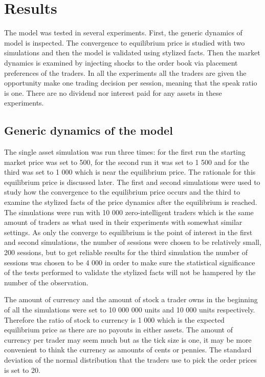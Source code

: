 
\section{Results}

The model was tested in several experiments. First, the generic dynamics of 
model is inspected. The convergence to equilibrium price is studied with two
simulations and then the model is validated using stylized facts. Then the
market dynamics is examined by injecting shocks to the order book via placement 
preferences of the traders. In all the experiments all the traders are given the 
opportunity make one trading decision per session, meaning that the speak ratio 
is one. There are no dividend nor interest paid for any assets in these experiments.

\subsection{Generic dynamics of the model}
The single asset simulation was run three times: for the first run
the starting market price was set to 500, for the second run it
was set to 1 500 and for the third was set to 1 000 which is near the equilibrium price. 
The rationale for this equilibrium price is discussed later.
The first and second simulations were
used to study how the convergence to the equilibrium price occurs
and the third to examine the stylized facts of the price
dynamics after the equilibrium is reached. The simulations were
run with 10 000 zero-intelligent traders which is the 
same amount of traders as what \citet{Raberto05} used in their experiments
with somewhat similar settings. As only the converge to equilibrium is 
the point of interest in the first and second simulations, the number of sessions
were chosen to be relatively small, 200 sessions, but to get reliable results for
the third simulation the number of sessions was chosen to be 4 000 in order to 
make sure the statistical significance of the tests performed to validate the 
stylized facts will not be hampered by the number of the observation.

The amount of currency and the amount of stock 
a trader owns in the beginning of all the simulations were set to
10 000 000 units and 10 000 units respectively. Therefore
the ratio of stock to currency is 1 000 which
is the expected equilibrium price as there are
no payouts in either assets. The amount of currency
per trader may seem much but as the tick size is one,
it may be more convenient to think the currency as amounts
of cents or pennies. The standard deviation of
the normal distribution that the traders use to pick the order prices
is set to 20.

